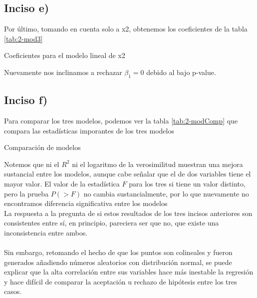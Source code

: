 \documentclass[11pt]{article}
\begin{document}
\subsection{Inciso e)}
Por último, tomando en cuenta solo a x2, obtenemos los coeficientes de la tabla \ref{tab:2-mod3}
\begin{table}[H]
    \centering
    
    \caption{Coeficientes para el modelo lineal de x2}
    \label{tab:2-mod3}
\end{table}
Nuevamente nos inclinamos a rechazar $\beta_1 = 0$  debido al bajo p-value.
\subsection{Inciso f)}
Para comparar los tres modelos, podemos ver la tabla \ref{tab:2-modComp}
que compara las estadísticas imporantes de los tres modelos
\begin{table}[H]
    \centering
    
    \caption{Comparación de modelos}
    \label{2-modComp}
\end{table}
Notemos que ni el $R^2$ ni el logaritmo de la verosimilitud muestran una mejora sustancial entre los modelos, aunque cabe señalar que el de dos variables tiene el mayor valor. El valor de la estadística $F$ para los tres si tiene un valor distinto, pero la prueba $P(>F)$ no cambia sustancialmente, por lo que nuevamente no encontramos diferencia significativa entre los modelos
\\
La respuesta a la pregunta de si estos resultados de los tres incisos anteriores son consistentes entre sí, en principio, pareciera ser que no, que existe una inconsistencia entre ambos.
\\
\\Sin embargo, retomando el hecho de que los puntos son colineales y fueron generados añadiendo números aleatorios con distribución normal, se puede explicar que la alta correlación entre sus variables hace más inestable la regresión y hace difícil de comparar la aceptación u rechazo de hipótesis entre los tres casos.
\end{document}
